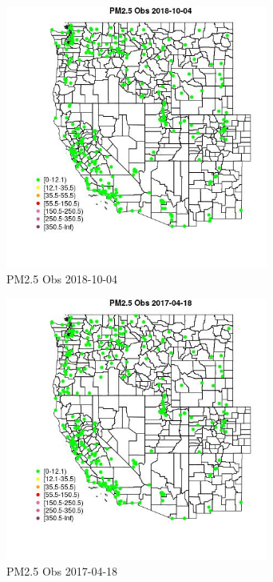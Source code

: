 \begin{figure} 
\centering  
\includegraphics[width=0.77\textwidth]{Code_Outputs/Report_ML_input_PM25_Step4_part_f_de_duplicated_aves_prioritize_24hr_obswNAs_MapObsPM25_Obs2018-10-04.jpg} 
\caption{\label{fig:Report_ML_input_PM25_Step4_part_f_de_duplicated_aves_prioritize_24hr_obswNAsMapObsPM25_Obs2018-10-04}PM2.5 Obs 2018-10-04} 
\end{figure} 
 

\begin{figure} 
\centering  
\includegraphics[width=0.77\textwidth]{Code_Outputs/Report_ML_input_PM25_Step4_part_f_de_duplicated_aves_prioritize_24hr_obswNAs_MapObsPM25_Obs2017-04-18.jpg} 
\caption{\label{fig:Report_ML_input_PM25_Step4_part_f_de_duplicated_aves_prioritize_24hr_obswNAsMapObsPM25_Obs2017-04-18}PM2.5 Obs 2017-04-18} 
\end{figure} 
 

